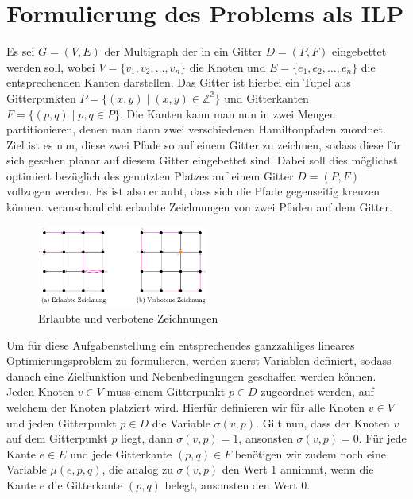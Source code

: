 \documentclass[bachelor, german]{algothesis}
\begin{document}
\section{Formulierung des Problems als ILP}
Es sei $G = (V,E)$ der Multigraph der in ein Gitter $D=(P,F)$ eingebettet werden soll, wobei $V=\{v_1,v_2,\dots, v_n\} $ die Knoten und $E=\{e_1, e_2, \dots, e_n\}$ die entsprechenden Kanten darstellen. Das Gitter ist hierbei ein Tupel aus Gitterpunkten $P=\{(x,y) \mid (x,y) \in \mathbb{Z^2} \}$ und Gitterkanten $F=\{(p,q) \mid p,q \in P\}$. Die Kanten kann man nun in zwei Mengen partitionieren, denen man dann zwei verschiedenen Hamiltonpfaden zuordnet. Ziel ist es nun, diese zwei Pfade so auf einem Gitter zu zeichnen, sodass diese für sich gesehen planar auf diesem Gitter eingebettet sind. Dabei soll dies möglichst optimiert bezüglich des genutzten Platzes auf einem Gitter $D=(P,F)$ vollzogen werden. Es ist also erlaubt, dass sich die Pfade gegenseitig kreuzen können.  veranschaulicht erlaubte Zeichnungen von zwei Pfaden auf dem Gitter. \newline
\begin{figure}[H]
    \centering
    \includegraphics[width=0.5\textwidth]{figures/Erlaubt.png}
    \caption{Erlaubte und verbotene Zeichnungen}
    \label{fig:Grid_Example}
\end{figure}
Um für diese Aufgabenstellung ein entsprechendes ganzzahliges lineares Optimierungsproblem zu formulieren, werden zuerst Variablen definiert, sodass danach eine Zielfunktion und Nebenbedingungen geschaffen werden können. \newline
Jeden Knoten $v \in V$ muss einem Gitterpunkt $p \in D$ zugeordnet werden, auf welchem der Knoten platziert wird. Hierfür definieren wir für alle Knoten $v \in V$ und jeden Gitterpunkt $p \in D$ die Variable $\sigma(v,p)$. Gilt nun, dass der Knoten $v$ auf dem Gitterpunkt $p$ liegt, dann $\sigma(v,p) = 1$, ansonsten $\sigma(v,p) = 0$.  \newline
Für jede Kante $e \in E$ und jede Gitterkante $(p,q) \in F$ benötigen wir zudem noch eine Variable $\mu(e,p,q)$, die analog zu $\sigma(v,p)$ den Wert 1 annimmt, wenn die Kante $e$ die Gitterkante $(p,q)$ belegt, ansonsten den Wert 0.\newline
\end{document}

